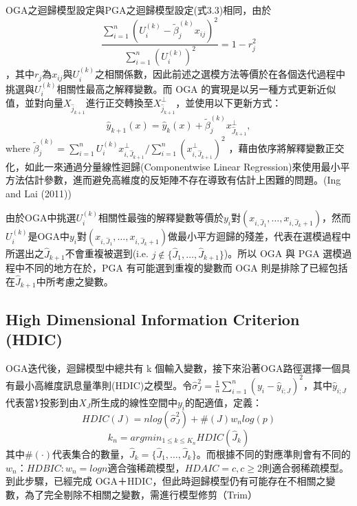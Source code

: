 OGA之迴歸模型設定與PGA之迴歸模型設定(式3.3)相同，由於
\begin{equation}
\displaystyle \frac{\sum^{n}_{i=1}(U_i^{(k)}-\tilde{\beta}_j^{(k)}x_{ij})^2}{\sum_{i=1}^{n}(U_i^{(k)})^2}=1-r_j^2
\end{equation}
，其中$r_{j}$為$x_{ij}$與$U_i^{(k)}$之相關係數，因此前述之選模方法等價於在各個迭代過程中挑選與$U_i^{(k)}$相關性最高之解釋變數。而 OGA 的實現是以另一種方式更新近似值，並對向量$ X_{\hat{j}_{k+1}} $進行正交轉換至$ X_{\hat{j}_{k+1}}^{\bot} $，並使用以下更新方式：
\begin{equation}
\hat{y}_{k+1}(x)=\hat{y}_{k}(x)+ \tilde{\beta}_j^{(k)}x_{\hat{J}_{k+1}}^{\bot}, 
\end{equation}
where $\displaystyle \tilde{\beta}_j^{(k)}=\sum_{i=1}^{n} U_i^{(k)}x_{i,\hat{J}_{k+1}}^\bot / \sum_{i=1}^{n}(x_{i,\hat{J}_{k+1}}^\bot)^2$
，藉由依序將解釋變數正交化，如此一來通過分量線性迴歸(Componentwise Linear Regression)來使用最小平方法估計參數，進而避免高維度的反矩陣不存在導致有估計上困難的問題。(Ing and Lai (2011))

由於OGA中挑選$U_i^{(k)}$相關性最強的解釋變數等價於$y_{i}$對$(x_{i,\hat{J}_1},\ldots,x_{i,\hat{J}_k+1})$，然而$U_i^{(k)}$是OGA中$y_{i}$對$(x_{i,\hat{J}_1},\ldots,x_{i,\hat{J}_k+1})$做最小平方迴歸的殘差，代表在選模過程中所選出之$\hat{J}_{k+1}$不會重複被選到(i.e. $j \notin \{\hat{J}_{1},\ldots,\hat{J}_{k+1}\}$)。所以 OGA 與 PGA 選模過程中不同的地方在於，PGA 有可能選到重複的變數而 OGA 則是排除了已經包括在{$\hat{J}_{k+1}$}中所考慮之變數。


\subsection{High Dimensional Information Criterion (HDIC)}
OGA迭代後，迴歸模型中總共有 k 個輸入變數，接下來沿著OGA路徑選擇一個具有最小高維度訊息量準則(HDIC)之模型。令$\hat{\sigma}^{2}_{J} = \frac{1}{n}\sum_{i=1}^{n}(y_i - \hat{y}_{i;J})^{2}$，其中$\hat{y}_{i;J}$代表當$Y$投影到由$X_{J}$所生成的線性空間中$y_{i}$的配適值，定義：
\begin{equation}
HDIC(J) = nlog(\hat{\sigma}^{2}_{J})+\#(J)w_nlog(p)
\end{equation}
\begin{equation}
k_n = argmin_{1\leq k \leq K_n}HDIC(\hat{J}_k)
\end{equation}
其中$\#(\cdot)$代表集合的數量，$\hat{J}_{k}=\{\hat{J}_1,\ldots,\hat{J}_k\}$。而根據不同的對應準則會有不同的$w_{n}$：$HDBIC:w_{n}=logn$適合強稀疏模型，$HDAIC = c, c \geq 2$則適合弱稀疏模型。到此步驟，已經完成 OGA＋HDIC，但此時迴歸模型仍有可能存在不相關之變數，為了完全剔除不相關之變數，需進行模型修剪（Trim）
